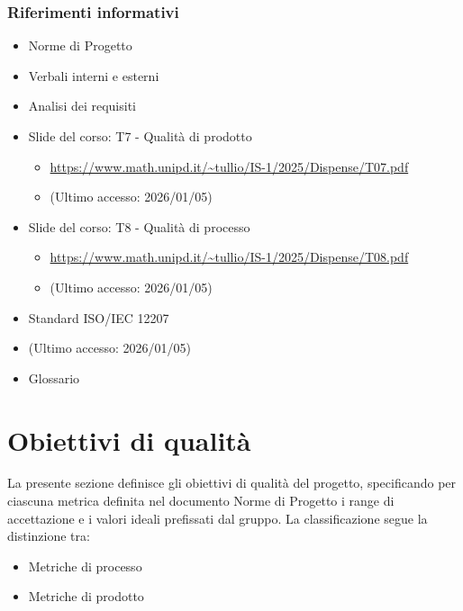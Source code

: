 \documentclass[a4paper,12pt]{article}
\begin{document}
{            \subsubsection{Riferimenti informativi}
                \begin{itemize}
                    \item Norme di Progetto
                    \item Verbali interni e esterni
                    \item Analisi dei requisiti
                    \item Slide del corso: T7 - Qualità di prodotto
                    \begin{itemize}
                        \item \url{https://www.math.unipd.it/~tullio/IS-1/2025/Dispense/T07.pdf}
                         \item[] (Ultimo accesso: 2026/01/05)
                    \end{itemize}
                    \item Slide del corso: T8 - Qualità di processo
                    \begin{itemize}
                        \item \url{https://www.math.unipd.it/~tullio/IS-1/2025/Dispense/T08.pdf}
                        \item[] (Ultimo accesso: 2026/01/05)
                    \end{itemize}
                    \item Standard ISO/IEC 12207
                        \item[] (Ultimo accesso: 2026/01/05)
                    \item Glossario
                \end{itemize}
    }

    \newpage

    \section{Obiettivi di qualità}
    La presente sezione definisce gli obiettivi di qualità del progetto, specificando per ciascuna metrica definita nel documento Norme di Progetto i range di accettazione e i valori ideali prefissati dal gruppo. La classificazione segue la distinzione tra:
    \begin{itemize}
        \item Metriche di processo
        \item Metriche di prodotto
    \end{itemize}
    
\end{document}
